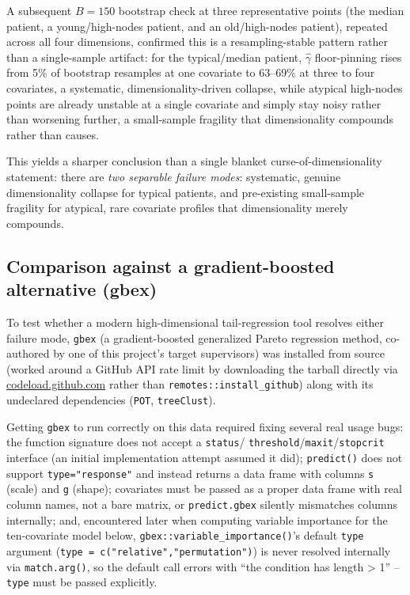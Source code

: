 \documentclass[11pt]{article}
\begin{document}
A subsequent $B=150$ bootstrap check at three representative points (the median
patient, a young/high-nodes patient, and an old/high-nodes patient), repeated
across all four dimensions, confirmed this is a resampling-stable pattern rather
than a single-sample artifact: for the typical/median patient, $\hat\gamma$
floor-pinning rises from 5\% of bootstrap resamples at one covariate to
63--69\% at three to four covariates, a systematic, dimensionality-driven
collapse, while atypical high-nodes points are already unstable at a single
covariate and simply stay noisy rather than worsening further, a small-sample
fragility that dimensionality compounds rather than causes.

This yields a sharper conclusion than a single blanket curse-of-dimensionality
statement: there are \emph{two separable failure modes}: systematic, genuine
dimensionality collapse for typical patients, and pre-existing small-sample
fragility for atypical, rare covariate profiles that dimensionality merely
compounds.

\subsection{Comparison against a gradient-boosted alternative (gbex)}

To test whether a modern high-dimensional tail-regression tool resolves either
failure mode, \texttt{gbex} \citep{gbex2021} (a gradient-boosted generalized
Pareto regression method, co-authored by one of this project's target
supervisors) was installed from source (worked around a GitHub API rate limit by
downloading the tarball directly via \url{codeload.github.com} rather than
\texttt{remotes::in\-stall\_git\-hub}) along with its undeclared dependencies
(\texttt{POT}, \texttt{treeClust}).

Getting \texttt{gbex} to run correctly on this data required fixing several real
usage bugs: the function signature does not accept a \texttt{status}/
\texttt{threshold}/\texttt{maxit}/\texttt{stopcrit} interface (an initial
implementation attempt assumed it did); \texttt{predict()} does not support
\texttt{type="response"} and instead returns a data frame with columns \texttt{s}
(scale) and \texttt{g} (shape); covariates must be passed as a proper data
frame with real column names, not a bare matrix, or \texttt{predict.gbex} silently
mismatches columns internally; and, encountered later when computing variable
importance for the ten-covariate model below, \texttt{gbex::variable\_importance()}'s
default \texttt{type} argument (\texttt{type = c("relative","permutation")}) is
never resolved internally via \texttt{match.arg()}, so the default call errors
with ``the condition has length > 1'' -- \texttt{type} must be passed explicitly.
\end{document}

